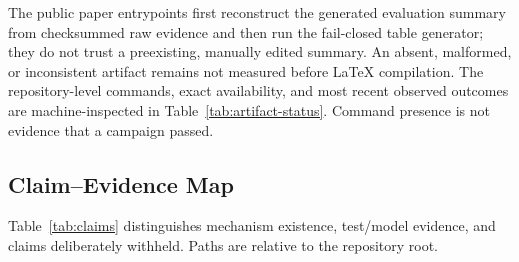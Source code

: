 \documentclass[10pt,journal,compsoc]{IEEEtran}
\begin{document}
The public paper entrypoints first reconstruct the generated evaluation summary
from checksummed raw evidence and then run the fail-closed table generator; they
do not trust a preexisting, manually edited summary.  An absent, malformed, or
inconsistent artifact remains not measured before LaTeX compilation.  The
repository-level commands, exact availability, and most recent observed
outcomes are machine-inspected in Table~\ref{tab:artifact-status}.  Command
presence is not evidence that a campaign passed.



\subsection{Claim--Evidence Map}

Table~\ref{tab:claims} distinguishes mechanism existence, test/model evidence,
and claims deliberately withheld.  Paths are relative to the repository root.
\end{document}
